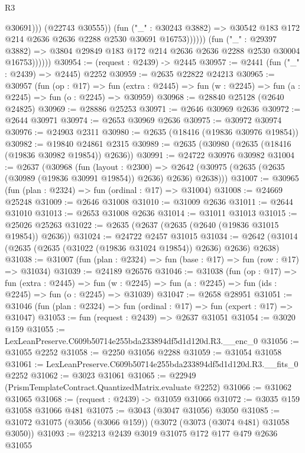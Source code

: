 \begin{lexlean}{R3}
\begin{coremodule}
                                @30691)))
                          (@22743 @30555))
                        (fun ("_" : @30243 @3882) =>
                        @30542 @183 @172 @214 @2636 @2636 @2288 @2530 @30691 @16753))))))
              (fun ("_" : @29397 @3882) =>
              @3804 @29849 @183 @172 @214 @2636 @2636 @2288 @2530 @30004 @16753))))))
@30954 := (request : @2439) -> @2445
@30957 := @2441 (fun ("_" : @2439) => @2445) @2252
@30959 := @2635 @22822 @24213
@30965 := @30957
    (fun (op : @17) =>
    fun (extra : @2445) => fun (w : @2245) => fun (a : @2245) => fun (o : @2245) => @30959)
@30968 := @28840 @25128 (@2640 @24825)
@30969 := @28886 @25253
@30971 := @2646 @30969 @2636
@30972 := @2644 @30971
@30974 := @2653 @30969 @2636
@30975 := @30972 @30974
@30976 := @24903 @2311
@30980 := @2635 (@18416 (@19836 @30976 @19854))
@30982 := @19840 @24861 @2315
@30989 := @2635 (@30980 (@2635 (@18416 (@19836 @30982 @19854)) @2636))
@30991 := @24722 @30976 @30982
@31004 := @2637
    (@30968
      (fun (layout : @2300) =>
      @2642 (@30975 (@2635 (@2635 (@30989 (@19836 @30991 @19854)) @2636) @2636) @2638)))
@31007 := @30965 (fun (plan : @2324) => fun (ordinal : @17) => @31004)
@31008 := @24669 @25248
@31009 := @2646 @31008
@31010 := @31009 @2636
@31011 := @2644 @31010
@31013 := @2653 @31008 @2636
@31014 := @31011 @31013
@31015 := @25026 @25263
@31022 := @2635 (@2637 (@2635 (@2640 (@19836 @31015 @19854)) @2636))
@31024 := @24722 @2457 @31015
@31034 := @2642 (@31014 (@2635 (@2635 (@31022 (@19836 @31024 @19854)) @2636) @2636) @2638)
@31038 := @31007 (fun (plan : @2324) => fun (base : @17) => fun (row : @17) => @31034)
@31039 := @24189 @26576
@31046 := @31038
    (fun (op : @17) =>
    fun (extra : @2445) =>
    fun (w : @2245) => fun (a : @2245) => fun (ids : @2245) => fun (o : @2245) => @31039)
@31047 := @2658 @28951
@31051 := @31046 (fun (plan : @2324) => fun (ordinal : @17) => fun (expert : @17) => @31047)
@31053 := fun (request : @2439) => @2637 @31051
@31054 := @3020 @159
@31055 := LexLeanPreserve.C609b50714e255bda233894df5d1d120d.R3.__enc_0
@31056 := @31055 @2252
@31058 := @2250 @31056 @2288
@31059 := @31054 @31058
@31061 := LexLeanPreserve.C609b50714e255bda233894df5d1d120d.R3.__fits_0 @2252
@31062 := @3023 @31061
@31065 := @22949 (PrismTemplateContract.QuantizedMatrix.evaluate @2252)
@31066 := @31062 @31065
@31068 := (request : @2439) -> @31059 @31066
@31072 := @3035 @159 @31058 @31066 @481
@31075 := @3043 (@3047 @31056) @3050
@31085 := @31072 @31075 (@3056 (@3066 @159)) (@3072 (@3073 (@3074 @481) @31058 @3050))
@31093 := @23213 @2439 @3019 @31075 @172 @177 @479 @2636 @31055

\end{coremodule}
\end{lexlean}
